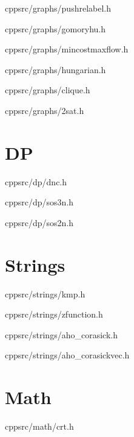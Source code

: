 \documentclass[portrait, 8pt, a4paper, oneside, twocolumn]{extarticle}
\begin{document}
    {}
    {}
    {cpp}{src/graphs/pushrelabel.h}
    \noindent\hrulefill

    {}
    {}
    {cpp}{src/graphs/gomoryhu.h}
    \noindent\hrulefill

    {}
    {}
    {cpp}{src/graphs/mincostmaxflow.h}
    \noindent\hrulefill

    {}
    {}
    {cpp}{src/graphs/hungarian.h}
    \noindent\hrulefill

    {}
    {}
    {cpp}{src/graphs/clique.h}
    \noindent\hrulefill

    {}
    {}
    {cpp}{src/graphs/2sat.h}
    \noindent\hrulefill

\section{DP}
    {}
    {}
    {cpp}{src/dp/dnc.h}
    \noindent\hrulefill
	
	{}
	{}
	{cpp}{src/dp/sos3n.h}
	\noindent\hrulefill

	{}
	{}
	{cpp}{src/dp/sos2n.h}
	\noindent\hrulefill

\section{Strings}
	
    {}
    {}
    {cpp}{src/strings/kmp.h}
    \noindent\hrulefill

    {}
    {}
    {cpp}{src/strings/zfunction.h}
    \noindent\hrulefill

    {}
    {}
    {cpp}{src/strings/aho_corasick.h}
    \noindent\hrulefill

    {}
    {}
    {cpp}{src/strings/aho_corasickvec.h}
    \noindent\hrulefill

    
\section{Math}

    {}
    {}
    {cpp}{src/math/crt.h}
    \noindent\hrulefill
\end{document}
